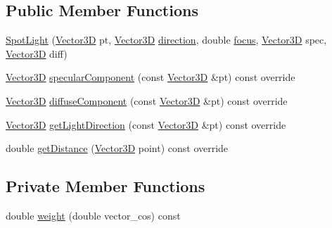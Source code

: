 \subsection*{Public Member Functions}
\begin{DoxyCompactItemize}
\item 
\mbox{\hyperlink{classSpotLight_a2c1e4da1b0f152f7a46e9a1eff42a008}{Spot\+Light}} (\mbox{\hyperlink{classVector3D}{Vector3D}} pt, \mbox{\hyperlink{classVector3D}{Vector3D}} \mbox{\hyperlink{classSpotLight_a536a59851dfaafa45f15c120295a1d24}{direction}}, double \mbox{\hyperlink{classSpotLight_a0fe5ae38bd4778e16fc2c1587c554a69}{focus}}, \mbox{\hyperlink{classVector3D}{Vector3D}} spec, \mbox{\hyperlink{classVector3D}{Vector3D}} diff)
\item 
\mbox{\hyperlink{classVector3D}{Vector3D}} \mbox{\hyperlink{classSpotLight_a6a1cc6970bbb3308b5214f85641331cd}{specular\+Component}} (const \mbox{\hyperlink{classVector3D}{Vector3D}} \&pt) const override
\item 
\mbox{\hyperlink{classVector3D}{Vector3D}} \mbox{\hyperlink{classSpotLight_a0810e4bd136caddea0c65b819f2bd400}{diffuse\+Component}} (const \mbox{\hyperlink{classVector3D}{Vector3D}} \&pt) const override
\item 
\mbox{\hyperlink{classVector3D}{Vector3D}} \mbox{\hyperlink{classSpotLight_a051e210b637edf37bf2b8d49149a13a4}{get\+Light\+Direction}} (const \mbox{\hyperlink{classVector3D}{Vector3D}} \&pt) const override
\item 
double \mbox{\hyperlink{classSpotLight_a117f7918773e193f67714765c5370418}{get\+Distance}} (\mbox{\hyperlink{classVector3D}{Vector3D}} point) const override
\end{DoxyCompactItemize}
\subsection*{Private Member Functions}
\begin{DoxyCompactItemize}
\item 
double \mbox{\hyperlink{classSpotLight_a7f32b04fa57511eb51d4fd820c023aff}{weight}} (double vector\+\_\+cos) const
\end{DoxyCompactItemize}
